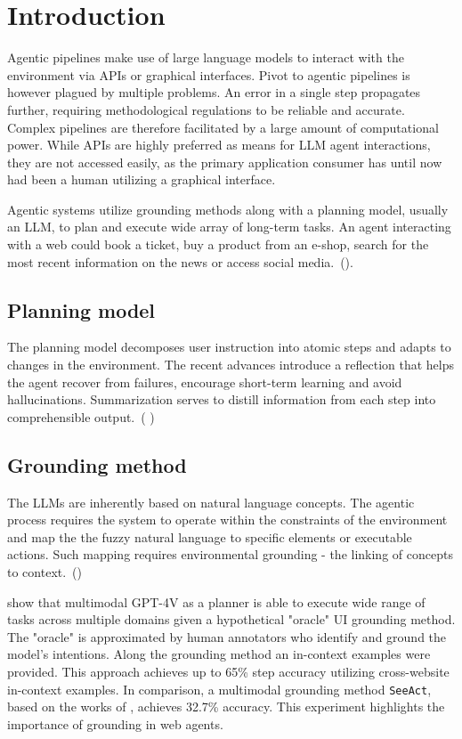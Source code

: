 \chapter{Introduction}
Agentic pipelines make use of large language models to interact with the environment via APIs or graphical interfaces. Pivot to agentic pipelines is however plagued by multiple problems. An error in a single step propagates further, requiring methodological regulations to be reliable and accurate. Complex pipelines are therefore facilitated by a large amount of computational power. While APIs are highly preferred as means for LLM agent interactions, they are not accessed easily, as the primary application consumer has until now had been a human utilizing a graphical interface.

Agentic systems utilize grounding methods along with a planning model, usually an LLM, to plan and execute wide array of long-term tasks. An agent interacting with a web could book a ticket, buy a product from an e-shop, search for the most recent information on the news or access social media.~(\cite{zheng_gpt-4vision_2024}).

\section{Planning model}
The planning model decomposes user instruction into atomic steps and adapts to changes in the environment. The recent advances introduce a reflection that helps the agent recover from failures, encourage short-term learning and avoid hallucinations. Summarization serves to distill information from each step into comprehensible output.~(\cite{guo_opagent_2026} )

\section{Grounding method}
The LLMs are inherently based on natural language concepts. The agentic process requires the system to operate within the constraints of the environment and map the the fuzzy natural language to specific elements or executable actions. Such mapping requires environmental grounding - the linking of concepts to context.~(\cite{chandu-etal-2021-grounding})

\textcite{zheng_gpt-4vision_2024} show that multimodal GPT-4V as a planner is able to execute wide range of tasks across multiple domains given a hypothetical "oracle" UI grounding method. The "oracle" is approximated by human annotators who identify and ground the model's intentions. Along the grounding method an in-context examples were provided. This approach achieves up to 65\% step accuracy utilizing cross-website in-context examples. In comparison, a multimodal grounding method \texttt{SeeAct}, based on the works of \textcite{deng_mind2web_2023}, achieves 32.7\% accuracy. This experiment highlights the importance of grounding in web agents.

